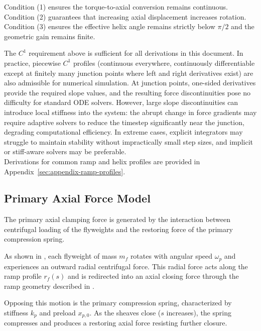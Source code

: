 \documentclass[11pt]{article}
\numberwithin{equation}{section}
\begin{document}
Condition (1) ensures the torque-to-axial conversion remains continuous.
Condition (2) guarantees that increasing axial displacement increases
rotation. Condition (3) ensures the effective helix angle
remains strictly below $\pi/2$ and the geometric gain remains finite.

\begin{remarkbox}
The $C^1$ requirement above is sufficient for all derivations in this document.
In practice, piecewise $C^1$ profiles (continuous everywhere, continuously
differentiable except at finitely many junction points where left and right
derivatives exist) are also admissible for numerical simulation. At junction
points, one-sided derivatives provide the required slope values, and the
resulting force discontinuities pose no difficulty for standard ODE solvers.
However, large slope discontinuities can introduce local stiffness into the
system: the abrupt change in force gradients may require adaptive solvers to
reduce the timestep significantly near the junction, degrading computational
efficiency. In extreme cases, explicit integrators may struggle to maintain
stability without impractically small step sizes, and implicit or stiff-aware
solvers may be preferable.
\\

Derivations for common ramp and helix profiles are provided in
Appendix~\ref{sec:appendix-ramp-profiles}.
\end{remarkbox}


\subsection{Primary Axial Force Model}\label{sec:primary-axial}

The primary axial clamping force is generated by the interaction
between centrifugal loading of the flyweights and the restoring
force of the primary compression spring.

As shown in , each flyweight of mass $m_f$
rotates with angular speed $\omega_p$ and experiences an outward
radial centrifugal force. This radial force acts along the ramp
profile $r_f(s)$ and is redirected into an axial closing force
through the ramp geometry described in .

Opposing this motion is the primary compression spring, characterized
by stiffness $k_p$ and preload $x_{p,0}$. As the sheaves close
($s$ increases), the spring compresses and produces a restoring
axial force resisting further closure.
\end{document}
